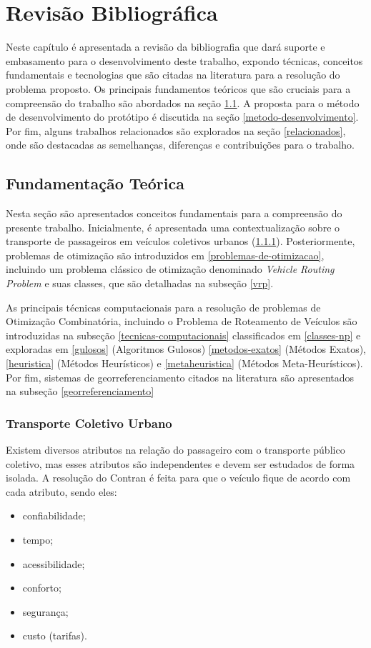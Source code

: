 \chapter{Revisão Bibliográfica}

Neste capítulo é apresentada a revisão da bibliografia que dará suporte e embasamento para o desenvolvimento deste trabalho, expondo técnicas, conceitos fundamentais e tecnologias que são citadas na literatura para a resolução do problema proposto. Os principais fundamentos teóricos que são cruciais para a compreensão do trabalho são abordados na seção \ref{fundamentacao}. A proposta para o método de desenvolvimento do protótipo é discutida na seção \ref{metodo-desenvolvimento}. Por fim, alguns trabalhos relacionados são explorados na seção \ref{relacionados}, onde são destacadas as semelhanças, diferenças e contribuições para o trabalho.

\section{Fundamentação Teórica}\label{fundamentacao}
Nesta seção são apresentados conceitos fundamentais para a compreensão do presente trabalho. Inicialmente, é apresentada uma contextualização sobre o transporte de passageiros em veículos coletivos urbanos (\ref{transporte-urbano}). Posteriormente, problemas de otimização são introduzidos em \ref{problemas-de-otimizacao}, incluindo um problema clássico de otimização denominado \emph{Vehicle Routing Problem} e suas classes, que são detalhadas na subseção \ref{vrp}. 

As principais técnicas computacionais para a resolução de problemas de Otimização Combinatória, incluindo o Problema de Roteamento de Veículos são introduzidas na subseção \ref{tecnicas-computacionais} classificados em \ref{classes-np} e exploradas em \ref{gulosos} (Algoritmos Gulosos) \ref{metodos-exatos} (Métodos Exatos), \ref{heuristica} (Métodos Heurísticos) e \ref{metaheuristica} (Métodos Meta-Heurísticos). Por fim, sistemas de georreferenciamento citados na literatura são apresentados na subseção \ref{georreferenciamento}

\subsection{Transporte Coletivo Urbano}\label{transporte-urbano}
Existem diversos atributos na relação do passageiro com o transporte público coletivo, mas esses atributos são independentes e devem ser estudados de forma isolada. A resolução do Contran \cite{denatran} é feita para que o veículo fique de acordo com cada atributo, sendo eles:
\begin{itemize}
    \item confiabilidade;
    \item tempo;
    \item acessibilidade;
    \item conforto;
    \item segurança;
    \item custo (tarifas).
\end{itemize}

